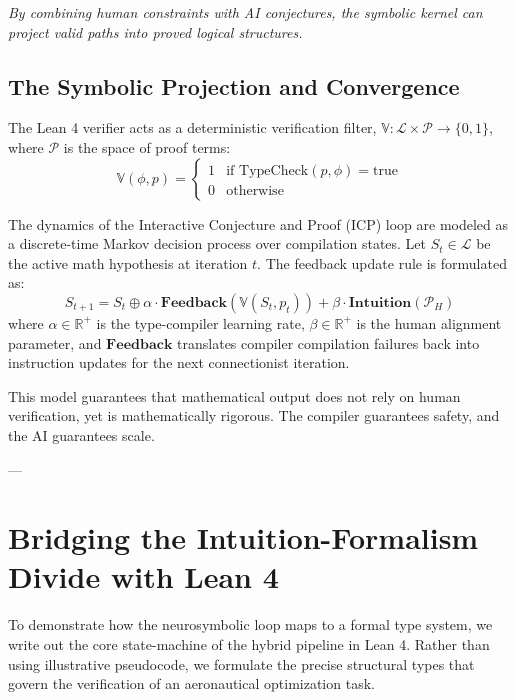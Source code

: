 \documentclass[11pt,a4paper]{book}
\begin{document}
\textit{By combining human constraints with AI conjectures, the symbolic kernel can project valid paths into proved logical structures.}

\subsection{The Symbolic Projection and Convergence}
The Lean 4 verifier acts as a deterministic verification filter, $\mathbb{V}: \mathcal{L} \times \mathcal{P} \to \{0, 1\}$, where $\mathcal{P}$ is the space of proof terms:
\begin{equation}
    \mathbb{V}(\phi, p) = 
    \begin{cases} 
         1 & \text{if } \text{TypeCheck}(p, \phi) = \text{true} \\
         0 & \text{otherwise} 
    \end{cases}
\end{equation}

The dynamics of the Interactive Conjecture and Proof (ICP) loop are modeled as a discrete-time Markov decision process over compilation states. Let $S_t \in \mathcal{L}$ be the active math hypothesis at iteration $t$. The feedback update rule is formulated as:
\begin{equation}
    S_{t+1} = S_t \oplus \alpha \cdot \mathbf{Feedback}(\mathbb{V}(S_t, p_t)) + \beta \cdot \mathbf{Intuition}(\mathcal{P}_H)
\end{equation}
where $\alpha \in \mathbb{R}^+$ is the type-compiler learning rate, $\beta \in \mathbb{R}^+$ is the human alignment parameter, and $\mathbf{Feedback}$ translates compiler compilation failures back into instruction updates for the next connectionist iteration.

This model guarantees that mathematical output does not rely on human verification, yet is mathematically rigorous. The compiler guarantees safety, and the AI guarantees scale.

---

\section{Bridging the Intuition-Formalism Divide with Lean 4}
\label{sec:lean_bridging}

To demonstrate how the neurosymbolic loop maps to a formal type system, we write out the core state-machine of the hybrid pipeline in Lean 4. Rather than using illustrative pseudocode, we formulate the precise structural types that govern the verification of an aeronautical optimization task.
\end{document}

